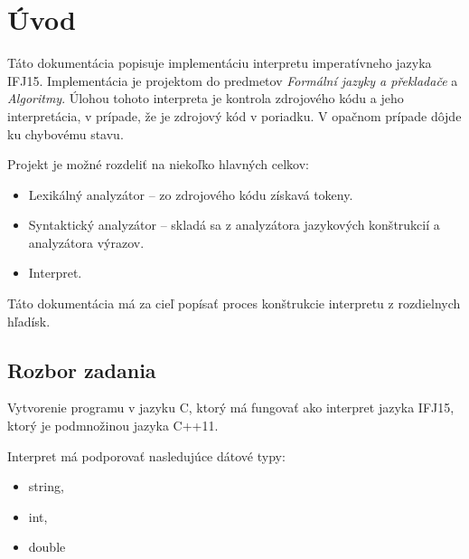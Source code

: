\documentclass[12pt,a4paper,titlepage,final]{article}
\begin{document}


\pagestyle{plain}
\setcounter{page}{1}
\tableofcontents

\newpage
\pagestyle{plain}
\setcounter{page}{1}

\section{Úvod} \label{uvod}
Táto dokumentácia popisuje implementáciu interpretu imperatívneho jazyka IFJ15. Implementácia je projektom do predmetov \textit{Formální jazyky a překladače} a \textit{Algoritmy}. Úlohou tohoto interpreta je kontrola zdrojového kódu a jeho interpretácia, v prípade, že je zdrojový kód v poriadku. V opačnom prípade dôjde ku chybovému stavu. 

Projekt je možné rozdeliť na niekoľko hlavných celkov:

\begin{itemize}
\item Lexikálný analyzátor – zo zdrojového kódu získavá tokeny.
\item Syntaktický analyzátor – skladá sa z analyzátora jazykových konštrukcií a analyzátora výrazov. 
\item Interpret.
\end{itemize}

Táto dokumentácia má za cieľ popísať proces konštrukcie interpretu z rozdielnych hľadísk. 

\subsection{Rozbor zadania}
Vytvorenie programu v jazyku C, ktorý má fungovať ako interpret jazyka IFJ15, ktorý je podmnožinou jazyka C++11.


Interpret má podporovať nasledujúce dátové typy:

\begin{itemize}
\item string,
\item int,
\item double
\end{itemize}
\end{document}
